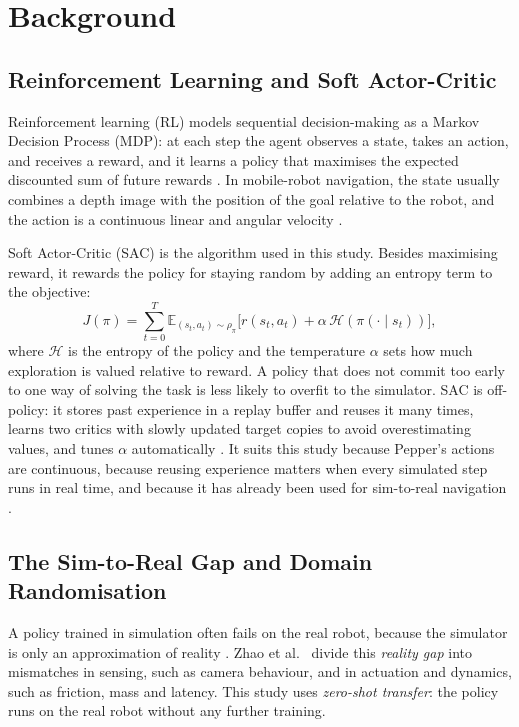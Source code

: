 \section{Background}\label{sec:background}

\subsection{Reinforcement Learning and Soft Actor-Critic}
Reinforcement learning (RL) models sequential decision-making as a Markov Decision Process
(MDP): at each step the agent observes a state, takes an action, and receives a reward, and it
learns a policy that maximises the expected discounted sum of future rewards
\cite{sutton2018rl}. In mobile-robot navigation, the state usually combines a depth image with
the position of the goal relative to the robot, and the action is a continuous linear and
angular velocity \cite{chaffre2020sim}.

Soft Actor-Critic (SAC) \cite{haarnoja2018sac} is the algorithm used in this study. Besides
maximising reward, it rewards the policy for staying random by adding an entropy term to the
objective:
\begin{equation}
J(\pi)=\sum_{t=0}^{T}\mathbb{E}_{(s_t,a_t)\sim\rho_\pi}\big[r(s_t,a_t)+\alpha\,\mathcal{H}(\pi(\cdot\mid s_t))\big],
\label{eq:sac}
\end{equation}
where $\mathcal{H}$ is the entropy of the policy and the temperature $\alpha$ sets how much
exploration is valued relative to reward. A policy that does not commit too early to one way of
solving the task is less likely to overfit to the simulator. SAC is off-policy: it stores past
experience in a replay buffer and reuses it many times, learns two critics with slowly updated
target copies to avoid overestimating values, and tunes $\alpha$ automatically
\cite{haarnoja2018sac}. It suits this study because Pepper's actions are continuous, because
reusing experience matters when every simulated step runs in real time, and because it has
already been used for sim-to-real navigation \cite{chaffre2020sim}.

\subsection{The Sim-to-Real Gap and Domain Randomisation}
A policy trained in simulation often fails on the real robot, because the simulator is only an
approximation of reality \cite{zhao2020sim, peng2018dynamics}. Zhao et al.\ \cite{zhao2020sim}
divide this \emph{reality gap} into mismatches in sensing, such as camera behaviour, and in
actuation and dynamics, such as friction, mass and latency. This study uses \emph{zero-shot
transfer}: the policy runs on the real robot without any further training.

